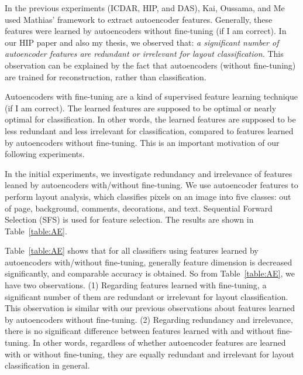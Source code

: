 \documentclass[10pt, conference, compsocconf]{IEEEtran}
\begin{document}
In the previous experiments (ICDAR, HIP, and DAS), Kai, Oussama, and Me used Mathias' framework to extract autoencoder features.
Generally, these features were learned by autoencoders without fine-tuning (if I am correct).
In our HIP paper and also my thesis, we observed that: \textit{a significant number of autoencoder features are redundant or irrelevant for layout classification.}
This observation can be explained by the fact that autoencoders (without fine-tuning) are trained for reconstruction, rather than classification.

Autoencoders with fine-tuning are a kind of supervised feature learning technique (if I am correct).
The learned features are supposed to be optimal or nearly optimal for classification.
In other words, the learned features are supposed to be less redundant and less irrelevant for classification, compared to features learned by autoencoders without fine-tuning.
This is an important motivation of our following experiments.


In the initial experiments, we investigate redundancy and irrelevance of features leaned by autoencoders with/without fine-tuning.
We use autoencoder features to perform layout analysis, which classifies pixels on an image into five classes: out of page, background, comments, decorations, and text.
Sequential Forward Selection (SFS) is used for feature selection.
The results are shown in Table~\ref{table:AE}.

Table~\ref{table:AE} shows that for all classifiers using features learned by autoencoders with/without fine-tuning, generally feature dimension is decreased significantly, and comparable accuracy is obtained.
So from Table~\ref{table:AE}, we have two observations.
(1) Regarding features learned with fine-tuning, a significant number of them are redundant or irrelevant for layout classification.
This observation is similar with our previous observations about features learned by autoencoders without fine-tuning.
(2) Regarding redundancy and irrelevance, there is no significant difference between features learned with and without fine-tuning.
In other words, regardless of whether autoencoder features are learned with or without fine-tuning, they are equally redundant and irrelevant for layout classification in general.
\end{document}
